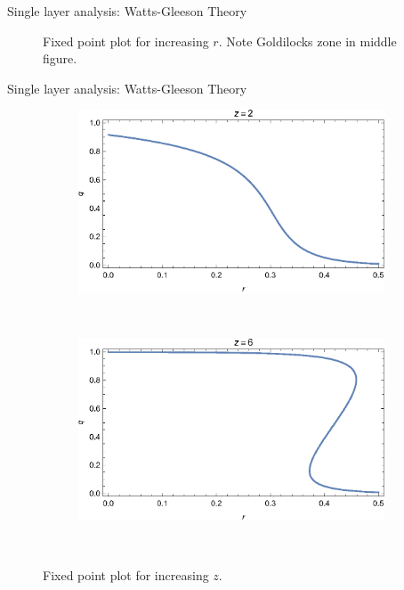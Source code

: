 \documentclass[10pt, xcolor=dvipsnames]{beamer}
\begin{document}
\begin{frame}{Single layer analysis: Watts-Gleeson Theory}
\begin{figure}
\begin{subfigure}[b]{0.4\textwidth}
    \end{subfigure}
    \caption{Fixed point plot for increasing $r$. Note Goldilocks zone in middle figure.}
\end{figure}
\end{frame}

\begin{frame}{Single layer analysis: Watts-Gleeson Theory}
\begin{figure}
    \centering
    \begin{subfigure}[b]{0.4\textwidth}
        \includegraphics[width=\textwidth]{figures/one_layer_qr_z2}
    \end{subfigure}
    ~ %
    \begin{subfigure}[b]{0.4\textwidth}
        \includegraphics[width=\textwidth]{figures/one_layer_qr_z6}
    \end{subfigure}
    ~ %
    \caption{Fixed point plot for increasing $z$.}
\end{figure}
\end{frame}
\end{document}
